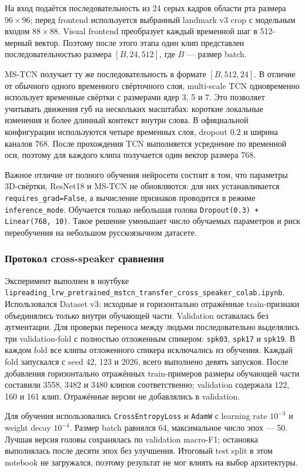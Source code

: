 \documentclass[12pt,a4paper]{article}
\begin{document}
На вход подаётся последовательность из 24 серых кадров области рта размера
$96\times96$; перед frontend используется выбранный landmark v3 crop с
модельным входом $88\times88$. Visual frontend преобразует каждый временной
шаг в 512-мерный вектор. Поэтому после этого этапа один клип представлен
последовательностью размера $[B,24,512]$, где $B$ --- размер batch.

MS-TCN получает ту же последовательность в формате $[B,512,24]$. В отличие
от обычного одного временного свёрточного слоя, multi-scale TCN одновременно
использует временные свёртки с размерами ядер 3, 5 и 7. Это позволяет учитывать
движения губ на нескольких масштабах: короткие локальные изменения и более
длинный контекст внутри слова. В официальной конфигурации используются четыре
временных слоя, dropout $0.2$ и ширина каналов $768$. После прохождения TCN
выполняется усреднение по временной оси, поэтому для каждого клипа получается
один вектор размера 768.

Важное отличие от полного обучения нейросети состоит в том, что параметры
3D-свёртки, ResNet18 и MS-TCN не обновляются: для них устанавливается
\texttt{requires\_grad=False}, а вычисление признаков проводится в режиме
\texttt{inference\_mode}. Обучается только небольшая голова
\texttt{Dropout(0.3) + Linear(768, 10)}. Такое решение уменьшает число
обучаемых параметров и риск переобучения на небольшом русскоязычном датасете.

\subsubsection{Протокол cross-speaker сравнения}

Эксперимент выполнен в ноутбуке
\texttt{lipreading\_lrw\_pretrained\_mstcn\_transfer\_cross\_speaker\_colab.ipynb}.
Использовался Dataset v3: исходные и горизонтально отражённые train-признаки
объединялись только внутри обучающей части. Validation оставалась без
аугментации. Для проверки переноса между людьми последовательно выделялись
три validation-fold с полностью отложенным спикером:
\texttt{spk03}, \texttt{spk17} и \texttt{spk19}. В каждом fold все клипы
отложенного спикера исключались из обучения. Каждый fold запускался с seed
42, 123 и 2026, всего выполнено девять запусков. После добавления
горизонтально отражённых train-примеров размеры обучающей части составили
3558, 3482 и 3480 клипов соответственно; validation содержала 122, 160 и
161 клип. Отражённые версии не добавлялись в validation.

Для обучения использовались \texttt{CrossEntropyLoss} и \texttt{AdamW} с
learning rate $10^{-3}$ и weight decay $10^{-4}$. Размер batch равнялся 64,
максимальное число эпох --- 50. Лучшая версия головы сохранялась по
validation macro-F1; остановка выполнялась после десяти эпох без улучшения.
Итоговый test split в этом notebook не загружался, поэтому результат не мог
влиять на выбор архитектуры.
\end{document}
